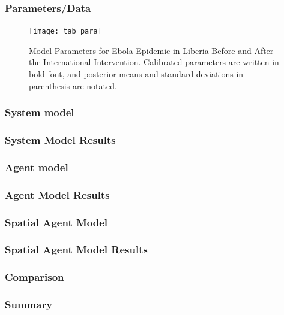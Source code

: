 \documentclass[30pt]{beamer}
\begin{document}
\begin{frame}
\frametitle{Parameters/Data}
\begin{figure}[!h]
  \centering
  \texttt{[image: tab\_para]}
  \caption{Model Parameters for Ebola Epidemic in Liberia Before and After the International Intervention. Calibrated parameters are written in bold font, and posterior means and standard deviations in parenthesis are notated. } 
\label{fig:compartment} 
\end{figure}

\end{frame}

\begin{frame}
\frametitle{System model}
\end{frame}

\begin{frame}
\frametitle{System Model Results}
\end{frame}

\begin{frame}
\frametitle{Agent model}
\end{frame}

\begin{frame}
\frametitle{Agent Model Results}
\end{frame}

\begin{frame}
\frametitle{Spatial Agent Model}
\end{frame}


\begin{frame}
\frametitle{Spatial Agent Model Results}
\end{frame}

\begin{frame}
\frametitle{Comparison}
\end{frame}

\begin{frame}
\frametitle{Summary}
\end{frame}
\end{document}
